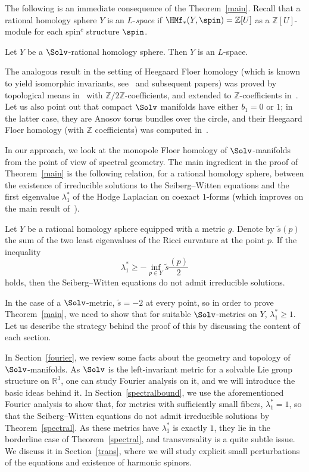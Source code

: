 The following is an immediate consequence of the Theorem~\ref{main}. Recall that a rational homology sphere $Y$ is an $L$-\emph{space} if $\HMf_*(Y,\spin)=\mathbb{Z}[U]$ as a $\mathbb{Z}[U]$-module for each spin$^c$ structure $\spin$.


\begin{coro}\label{corol}
Let $Y$ be a $\Solv$-rational homology sphere. Then $Y$ is an $L$-space.
\end{coro}

The analogous result in the setting of Heegaard Floer homology (which is known to yield isomorphic invariants, see~\cite{CGH1,HFHM1} and subsequent papers) was proved by topological means in~\cite{BCW} with $\mathbb{Z}/2\mathbb{Z}$-coefficients, and extended to $\mathbb{Z}$-coefficients in~\cite{RR}. Let us also point out that compact $\Solv$ manifolds have either $b_1=0$ or $1$; in the latter case, they are Anosov torus bundles over the circle, and their Heegaard Floer homology (with $\mathbb{Z}$ coefficients) was computed in~\cite{Bal}.


In our approach, we look at the monopole Floer homology of $\Solv$-manifolds from the point of view of spectral geometry. The main ingredient in the proof of Theorem~\ref{main} is the following relation, for a rational homology sphere, between the existence of irreducible solutions to the Seiberg--Witten equations and the first eigenvalue $\lambda_1^*$ of the Hodge Laplacian on coexact $1$-forms (which improves on the main result of~\cite{Lin4}).


\begin{theo}\label{spectral}
Let $Y$ be a rational homology sphere equipped with a metric $g$. Denote by $\tilde{s}(p)$ the sum of the two least eigenvalues of the Ricci curvature at the point $p$. If the inequality
\[
\lambda_1^*\geq -\inf_{p\in Y}\tilde{s}\frac{(p)}{2}
\]
holds, then the Seiberg--Witten equations do not admit irreducible solutions.
\end{theo}

In the case of a $\Solv$-metric, $\tilde{s}=-2$ at every point, so in order to prove Theorem~\ref{main}, we need to show that for suitable $\Solv$-metrics on $Y$, $\lambda_1^*\geq 1$. Let us describe the strategy behind the proof of this by discussing the content of each section.


In Section~\ref{fourier}, we review some facts about the geometry and topology of $\Solv$-manifolds. As $\Solv$ is the left-invariant metric for a solvable Lie group structure on $\mathbb{R}^3$, one can study Fourier analysis on it, and we will introduce the basic ideas behind it. In Section~\ref{spectralbound}, we use the aforementioned Fourier analysis to show that, for metrics with sufficiently small fibers, $\lambda_1^*= 1$, so that the Seiberg--Witten equations do not admit irreducible solutions by Theorem~\ref{spectral}. As these metrics have $\lambda^*_1$ is exactly $1$, they lie in the borderline case of Theorem~\ref{spectral}, and transversality is a quite subtle issue. We discuss it in Section~\ref{trans}, where we will study explicit small perturbations of the equations and existence of harmonic spinors.



